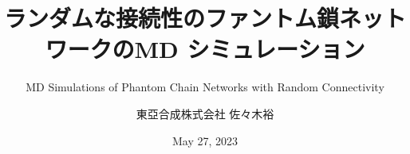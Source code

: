 \title{ランダムな接続性のファントム鎖ネットワークのMD シミュレーション}
\subtitle{MD Simulations of Phantom Chain Networks with Random Connectivity}
\author{東亞合成株式会社 佐々木裕}
\date{May 27, 2023}

\newcommand{\gakkai}{OCTA20周年記念講演会@名古屋大学}